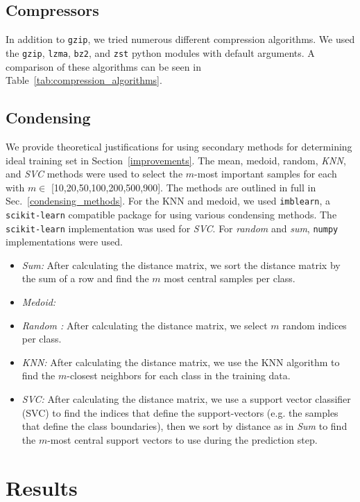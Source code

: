 \documentclass[conference]{IEEEtran}
\begin{document}
\subsection{Compressors}
\label{compressors}
In addition to \texttt{gzip}, we tried numerous different compression algorithms. We used the \texttt{gzip}, \texttt{lzma}, \texttt{bz2}, and \texttt{zst} python modules with default arguments. A comparison of these algorithms can be seen in Table~\ref{tab:compression_algorithms}.

\subsection{Condensing}
\label{condensing}
We provide theoretical justifications for using secondary methods for determining ideal training set in Section~\ref{improvements}. The mean, medoid, random, \textit{KNN}, and \textit{SVC} methods were used to select the $m$-most important samples for each with $m \in$ [10,20,50,100,200,500,900]. The methods are outlined in full in Sec.~\ref{condensing_methods}. For the KNN and medoid, we used \texttt{imblearn}, a \texttt{scikit-learn} compatible package for using various condensing methods. The \texttt{scikit-learn} implementation was used for \textit{SVC}. For \textit{random} and \textit{sum}, \texttt{numpy} implementations were used.

\begin{itemize}
    \item \textit{Sum:} After calculating the distance matrix, we sort the distance matrix by the sum of a row and find the $m$ most central samples per class.
    \item \textit{Medoid: }
    \item \textit{Random : } After calculating the distance matrix, we select $m$ random indices per class.
    \item \textit{KNN: } After calculating the distance matrix, we use the KNN algorithm to find the $m$-closest neighbors for each class in the training data.
    \item \textit{SVC: } After calculating the distance matrix, we use a support vector classifier (SVC) to find the indices that define the support-vectors (e.g. the samples that define the class boundaries), then we sort by distance as in \textit{Sum} to find the $m$-most central support vectors to use during the prediction step.
\end{itemize}

\section{Results}
\label{results}
\end{document}
